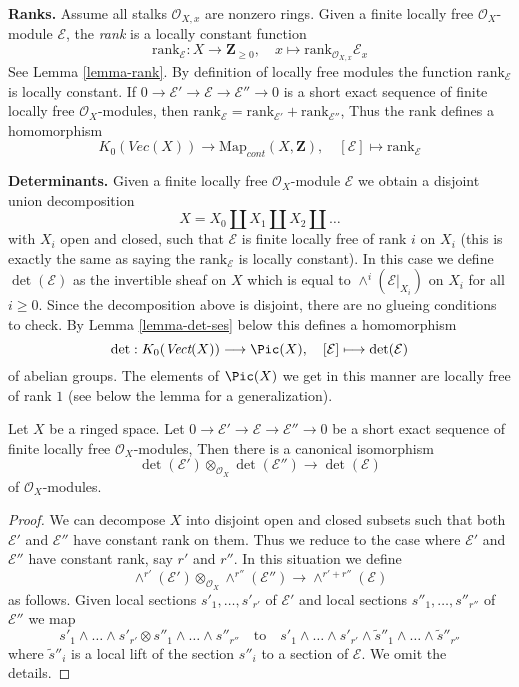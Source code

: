 \medskip\noindent
{\bf Ranks.} Assume all stalks $\mathcal{O}_{X, x}$ are nonzero rings.
Given a finite locally free $\mathcal{O}_X$-module $\mathcal{E}$,
the {\it rank} is a locally constant function
$$
\text{rank}_\mathcal{E} : X \longrightarrow \mathbf{Z}_{\geq 0},\quad
x \longmapsto \text{rank}_{\mathcal{O}_{X, x}} \mathcal{E}_x
$$
See Lemma \ref{lemma-rank}. By definition of locally free
modules the function $\text{rank}_\mathcal{E}$ is locally constant. If 
$0 \to \mathcal{E}' \to \mathcal{E} \to \mathcal{E}'' \to 0$
is a short exact sequence of finite locally free $\mathcal{O}_X$-modules,
then $\text{rank}_\mathcal{E} = \text{rank}_{\mathcal{E}'} +
\text{rank}_{\mathcal{E}''}$,
Thus the rank defines a homomorphism
$$
K_0(\textit{Vec}(X)) \longrightarrow \text{Map}_{cont}(X, \mathbf{Z}),\quad
[\mathcal{E}] \longmapsto \text{rank}_\mathcal{E}
$$

\medskip\noindent
{\bf Determinants.} Given a  finite locally free
$\mathcal{O}_X$-module $\mathcal{E}$ we obtain a disjoint union
decomposition
$$
X = X_0 \amalg X_1 \amalg X_2 \amalg \ldots
$$
with $X_i$ open and closed, such that $\mathcal{E}$ is finite locally
free of rank $i$ on $X_i$ (this is exactly the same as saying the
$\text{rank}_\mathcal{E}$ is locally constant). In this case we define
$\det(\mathcal{E})$ as the invertible sheaf on $X$ which is equal to
$\wedge^i(\mathcal{E}|_{X_i})$ on $X_i$ for all $i \geq 0$.
Since the decomposition above is disjoint, there are no glueing
conditions to check. By Lemma \ref{lemma-det-ses} below
this defines a homomorphism
$$
\det : K_0(\textit{Vect}(X)) \longrightarrow \Pic(X),\quad
[\mathcal{E}] \longmapsto \det(\mathcal{E})
$$
of abelian groups. The elements of $\Pic(X)$ we get in this manner
are locally free of rank $1$ (see below the lemma for a generalization).

\begin{lemma}
\label{lemma-det-ses}
Let $X$ be a ringed space. Let
$0 \to \mathcal{E}' \to \mathcal{E} \to \mathcal{E}'' \to 0$
be a short exact sequence of finite locally free $\mathcal{O}_X$-modules,
Then there is a canonical isomorphism
$$
\det(\mathcal{E}') \otimes_{\mathcal{O}_X}\det(\mathcal{E}'')
\longrightarrow
\det(\mathcal{E})
$$
of $\mathcal{O}_X$-modules.
\end{lemma}

\begin{proof}
We can decompose $X$ into disjoint open and closed subsets such that
both $\mathcal{E}'$ and $\mathcal{E}''$ have constant rank on them.
Thus we reduce to the case where $\mathcal{E}'$ and $\mathcal{E}''$
have constant rank, say $r'$ and $r''$. In this situation we
define
$$
\wedge^{r'}(\mathcal{E}') \otimes_{\mathcal{O}_X} \wedge^{r''}(\mathcal{E}'')
\longrightarrow
\wedge^{r' + r''}(\mathcal{E})
$$
as follows. Given local sections $s'_1, \ldots, s'_{r'}$ of $\mathcal{E}'$
and local sections $s''_1, \ldots, s''_{r''}$ of $\mathcal{E}''$
we map
$$
s'_1 \wedge \ldots \wedge s'_{r'} \otimes
s''_1 \wedge \ldots \wedge s''_{r''}
\quad\text{to}\quad
s'_1 \wedge \ldots \wedge s'_{r'} \wedge
\tilde s''_1 \wedge \ldots \wedge \tilde s''_{r''}
$$
where $\tilde s''_i$ is a local lift of the section
$s''_i$ to a section of $\mathcal{E}$. We omit the details.
\end{proof}

